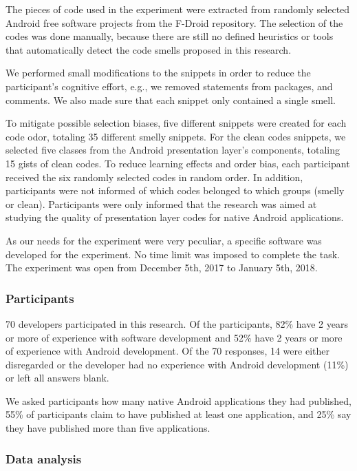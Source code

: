 The pieces of code used in the experiment were extracted from randomly selected Android free software projects from the F-Droid repository. 
The selection of the codes was done manually, because there are still no defined heuristics or tools that automatically detect the code smells proposed in this research.

We performed small modifications to the snippets in order to reduce the participant's cognitive effort, e.g., we removed statements from packages, and comments. We also made sure that each snippet only contained a single smell.

To mitigate possible selection biases, five different snippets were created for each code odor, totaling 35 different smelly snippets. For the clean codes snippets, we selected five classes from the Android presentation layer's components, totaling 15 gists of clean codes. 
To reduce learning effects and order bias, each participant received the six randomly selected codes in random order. In addition, participants were not informed of which codes belonged to which groups (smelly or clean). Participants were only informed that the research was aimed at studying the quality of presentation layer codes for native Android applications. 

As our needs for the experiment were very peculiar, a specific software was developed for the experiment. No time limit was imposed to complete the task.
The experiment was open from December 5th, 2017 to January 5th, 2018.


\subsubsection{Participants}
\label{etapa-3-participantes-analise}

70 developers participated in this research. Of the participants, 82\% have 2 years or more of experience with software development and 52\% have 2 years or more of experience with Android development. Of the 70 responses, 14 were either disregarded or the developer had no experience with Android development (11\%) or left all answers blank.

We asked participants how many native Android applications they had published, 55\% of participants claim to have published at least one application, and 25\% say they have published more than five applications.


\subsubsection{Data analysis}

